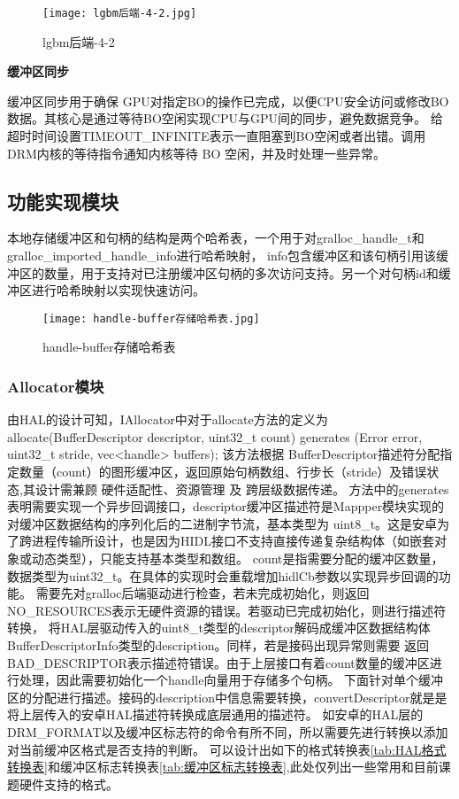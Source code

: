 \begin{figure}[h]
  \centering
  \texttt{[image: lgbm后端-4-2.jpg]}
  \caption{lgbm后端-4-2}
  \label{fig:lgbm后端-4-2}
\end{figure} 

\textbf{缓冲区同步}

缓冲区同步用于确保 GPU对指定BO的操作已完成，以便CPU安全访问或修改BO数据。其核心是通过​等待BO空闲​实现CPU与GPU间的同步，避免数据竞争。
给超时时间设置TIMEOUT\_INFINITE表示一直阻塞到BO空闲或者出错。调用DRM内核的等待指令通知内核等待 BO 空闲，并及时处理一些异常。

\subsection{功能实现模块}

本地存储缓冲区和句柄的结构是两个哈希表，一个用于对gralloc\_handle\_t和gralloc\_imported\_handle\_info进行哈希映射，
info包含缓冲区和该句柄引用该缓冲区的数量，用于支持对已注册缓冲区句柄的多次访问支持。另一个对句柄id和缓冲区进行哈希映射以实现快速访问。

\begin{figure}[h]
  \centering
  \texttt{[image: handle-buffer存储哈希表.jpg]}
  \caption{handle-buffer存储哈希表}
  \label{fig:handle-buffer存储哈希表}
\end{figure}

\subsubsection{Allocator模块}
由HAL的设计可知，IAllocator中对于allocate方法的定义为
allocate(BufferDescriptor descriptor, uint32\_t count) generates (Error error, uint32\_t stride, vec<handle> buffers);
该方法根据 BufferDescriptor描述符分配指定数量（count）的图形缓冲区，返回原始句柄数组、行步长（stride）及错误状态,其设计需兼顾 硬件适配性、资源管理 及 跨层级数据传递。
方法中的generates表明需要实现一个异步回调接口，descriptor缓冲区描述符是Mappper模块实现的对缓冲区数据结构的序列化后的二进制字节流，基本类型为
uint8\_t。这是安卓为了跨进程传输所设计，也是因为HIDL接口不支持直接传递复杂结构体（如嵌套对象或动态类型），只能支持基本类型和数组。
count是指需要分配的缓冲区数量，数据类型为uint32\_t。在具体的实现时会重载增加hidlCb参数以实现异步回调的功能。
需要先对gralloc后端驱动进行检查，若未完成初始化，则返回NO\_RESOURCES表示无硬件资源的错误。若驱动已完成初始化，则进行描述符转换，
将HAL层驱动传入的uint8\_t类型的descriptor解码成缓冲区数据结构体BufferDescriptorInfo类型的description。同样，若是接码出现异常则需要
返回BAD\_DESCRIPTOR表示描述符错误。由于上层接口有着count数量的缓冲区进行处理，因此需要初始化一个handle向量用于存储多个句柄。
下面针对单个缓冲区的分配进行描述。接码的description中信息需要转换，convertDescriptor就是是将上层传入的安卓HAL描述符转换成底层通用的描述符。
如安卓的HAL层的DRM\_FORMAT以及缓冲区标志符的命令有所不同，所以需要先进行转换以添加对当前缓冲区格式是否支持的判断。
可以设计出如下的格式转换表\ref{tab:HAL格式转换表}和缓冲区标志转换表\ref{tab:缓冲区标志转换表},此处仅列出一些常用和目前课题硬件支持的格式。

